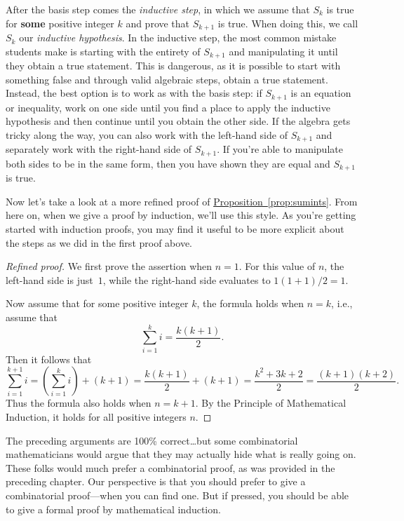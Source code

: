 After the basis step comes the \emph{inductive step}, in which we
assume that $S_k$ is true for \textbf{some} positive integer $k$ and
prove that $S_{k+1}$ is true. When doing this, we call $S_k$ our
\emph{inductive hypothesis}. In the inductive step, the most common
mistake students make is starting with the entirety of $S_{k+1}$ and
manipulating it until they obtain a true statement. This is dangerous,
as it is possible to start with something false and through valid
algebraic steps, obtain a true statement. Instead, the best option is
to work as with the basis step: if $S_{k+1}$ is an equation or inequality,
work on one side until you find a place to apply the inductive
hypothesis and then continue until you obtain the other side. If the
algebra gets tricky along the way, you can also work with the
left-hand side of $S_{k+1}$ and separately work with the right-hand side of
$S_{k+1}$. If you're able to manipulate both sides to be in the same
form, then you have shown they are equal and $S_{k+1}$ is true.

Now let's take a look at a more refined proof of
\hyperref[prop:sumints]{Proposition~\ref*{prop:sumints}}. From here
on, when we give a proof by induction, we'll use this style. As you're
getting started with induction proofs, you may find it useful to be
more explicit about the steps as we did in the first proof above.

\begin{proof}[Refined proof]
  We first prove the assertion when $n=1$.  For this value of $n$, the
  left-hand side is just~$1$, while the right-hand side evaluates to
  $1(1+1)/2=1$.

  Now assume that for some positive integer $k$, the formula holds
  when $n=k$, i.e., assume that
  \[
  \sum_{i=1}^k i=\frac{k(k+1)}{2}.
  \]
  Then it follows that
  \[
  \sum_{i=1}^{k+1}i=\left(\sum_{i=1}^k i\right) +(k+1)=
  \frac{k(k+1)}{2}+(k+1)=\frac{k^2+3k+2}{2}=\frac{(k+1)(k+2)}{2}.
  \]
  Thus the formula also holds when $n=k+1$.  By the Principle of
  Mathematical Induction, it holds for all positive integers $n$.
\end{proof}

The preceding arguments are 100\% correct\dots but some combinatorial
mathematicians would argue that they may actually hide what is really
going on.  These folks would much prefer a combinatorial proof, as was
provided in the preceding chapter.  Our perspective is that you should
prefer to give a combinatorial proof---when you can find one.  But if
pressed, you should be able to give a formal proof by mathematical
induction.

